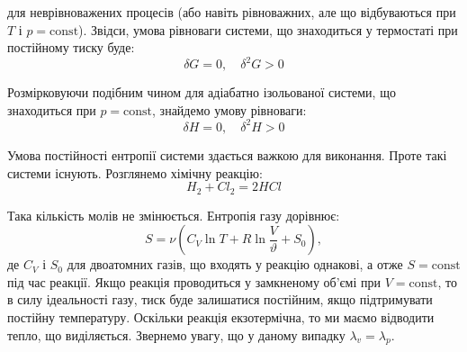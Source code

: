 для неврівноважених процесів (або навіть рівноважних, але що відбуваються при $T$ і $p = \text{const}$). Звідси, умова рівноваги системи, що знаходиться у термостаті при постійному тиску буде:
\begin{equation}\label{78.3}
\delta G = 0, \quad \delta^2 G > 0
\end{equation}

Розмірковуючи подібним чином для адіабатно ізольованої системи, що знаходиться при $p=\text{const}$, знайдемо умову рівноваги:
\begin{equation}\label{78.4}
\delta H = 0, \quad \delta^2 H > 0
\end{equation}

Умова постійності ентропії системи здається важкою для виконання. Проте такі системи існують. Розглянемо хімічну реакцію:
\begin{equation}
H_2 + Cl_2 = 2HCl
\end{equation}

Така кількість молів не змінюється. Ентропія газу дорівнює:
\begin{equation}
S = \nu\left(C_V \ln T + R \ln\frac{V}{\vartheta} + S_0\right),
\end{equation}
де $C_V$ і $S_0$ для двоатомних газів, що входять у реакцію однакові, а отже $S=\text{const}$ під час реакції. Якщо реакція проводиться у замкненому об'ємі при $V=\text{const}$, то в силу ідеальності газу, тиск буде залишатися постійним, якщо підтримувати постійну температуру. Оскільки реакція екзотермічна, то ми маємо відводити тепло, що виділяється. Звернемо увагу, що у даному випадку $\lambda_v = \lambda_p$.